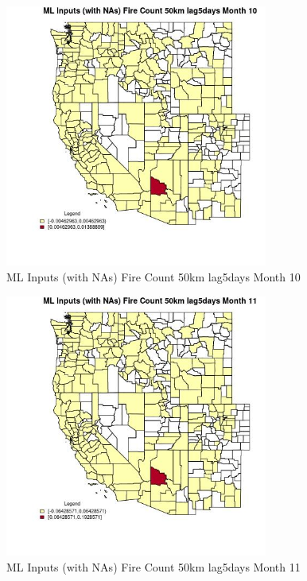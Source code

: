 \begin{figure} 
\centering  
\includegraphics[width=0.77\textwidth]{Code_Outputs/Report_ML_input_PM25_Step4_part_e_de_duplicated_aves_compiled_2019-05-21wNAs_CountyFire_Count_50km_lag5daysmedianMonth10.jpg} 
\caption{\label{fig:Report_ML_input_PM25_Step4_part_e_de_duplicated_aves_compiled_2019-05-21wNAsCountyFire_Count_50km_lag5daysmedianMonth10}ML Inputs (with NAs) Fire Count 50km lag5days Month 10} 
\end{figure} 
 

\begin{figure} 
\centering  
\includegraphics[width=0.77\textwidth]{Code_Outputs/Report_ML_input_PM25_Step4_part_e_de_duplicated_aves_compiled_2019-05-21wNAs_CountyFire_Count_50km_lag5daysmedianMonth11.jpg} 
\caption{\label{fig:Report_ML_input_PM25_Step4_part_e_de_duplicated_aves_compiled_2019-05-21wNAsCountyFire_Count_50km_lag5daysmedianMonth11}ML Inputs (with NAs) Fire Count 50km lag5days Month 11} 
\end{figure} 
 

